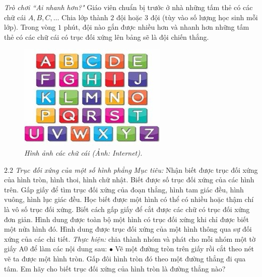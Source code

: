 \begin{multicols}{2}
	\vskip 0.1cm
	\textit{Trò chơi ``Ai nhanh hơn?"}
	\vskip 0.1cm
	Giáo viên chuẩn bị trước ở nhà những tấm thẻ có các chữ cái $A, B, C,\ldots$ Chia lớp thành $2$ đội hoặc $3$ đội (tùy vào số lượng học sinh mỗi lớp). Trong vòng $1$ phút, đội nào gắn được nhiều hơn và nhanh hơn những tấm thẻ có các chữ cái có trục đối xứng lên bảng sẽ là đội chiến thắng.
	\vskip 0.1cm
	\begin{figure}[H]
		\vspace*{-5pt}
		\centering
		\captionsetup{labelformat= empty, justification=centering}
		\includegraphics[width= 1\linewidth]{4}
		\caption{\small\textit{\color{diendantoanhoc}Hình ảnh các chữ cái (Ảnh: Internet).}}
		\vspace*{-10pt}
	\end{figure}
	$2.2$ \textit{Trục đối xứng của một số hình phẳng}
	\vskip 0.1cm
	\textit{Mục tiêu:} Nhận biết được trục đối xứng của hình tròn, hình thoi, hình chữ nhật. Biết được số trục đối xứng của các hình trên. Gấp giấy để tìm trục đối xứng của đoạn thẳng, hình tam giác đều, hình vuông, hình lục giác đều. Học biết được một hình có thể có nhiều hoặc thậm chí là vô số trục đối xứng. Biết cách gấp giấy để cắt được các chữ có trục đối xứng đơn giản. Hình dung được toàn bộ một hình có trục đối xứng khi chỉ được biết một nửa hình đó. Hình dung được trục đối xứng của một hình thông qua sự đối xứng của các chi tiết.
	\vskip 0.1cm
	\textit{Thực hiện:} chia thành nhóm và phát cho mỗi nhóm một tờ giấy A$0$ để làm các nội dung sau:
	\vskip 0.1cm
	$\bullet$	Vẽ một đường tròn trên giấy rồi cắt theo nét vẽ ta được một hình tròn. Gấp đôi hình tròn đó theo một đường thẳng đi qua tâm. Em hãy cho biết trục đối xứng của hình tròn là đường thẳng nào?

\end{multicols}
